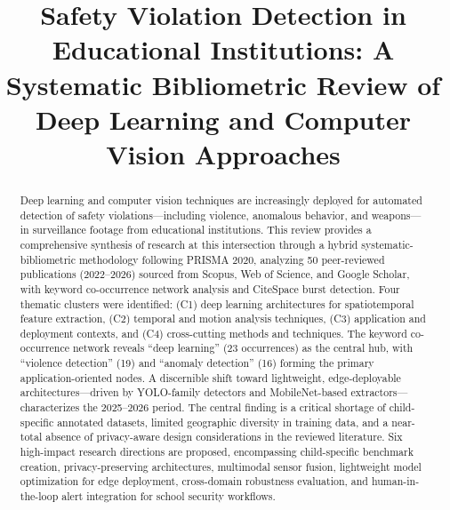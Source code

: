 \documentclass[conference]{IEEEtran}
\begin{document}
\title{Safety Violation Detection in Educational Institutions: A Systematic Bibliometric Review of Deep Learning and Computer Vision Approaches}

\author{
\and
{}
}

\maketitle

\begin{abstract}
Deep learning and computer vision techniques are increasingly deployed for automated detection of safety violations---including violence, anomalous behavior, and weapons---in surveillance footage from educational institutions. This review provides a comprehensive synthesis of research at this intersection through a hybrid systematic-bibliometric methodology following PRISMA 2020, analyzing 50 peer-reviewed publications (2022--2026) sourced from Scopus, Web of Science, and Google Scholar, with keyword co-occurrence network analysis and CiteSpace burst detection. Four thematic clusters were identified: (C1) deep learning architectures for spatiotemporal feature extraction, (C2) temporal and motion analysis techniques, (C3) application and deployment contexts, and (C4) cross-cutting methods and techniques. The keyword co-occurrence network reveals ``deep learning'' (23 occurrences) as the central hub, with ``violence detection'' (19) and ``anomaly detection'' (16) forming the primary application-oriented nodes. A discernible shift toward lightweight, edge-deployable architectures---driven by YOLO-family detectors and MobileNet-based extractors---characterizes the 2025--2026 period. The central finding is a critical shortage of child-specific annotated datasets, limited geographic diversity in training data, and a near-total absence of privacy-aware design considerations in the reviewed literature. Six high-impact research directions are proposed, encompassing child-specific benchmark creation, privacy-preserving architectures, multimodal sensor fusion, lightweight model optimization for edge deployment, cross-domain robustness evaluation, and human-in-the-loop alert integration for school security workflows.
\end{abstract}
\end{document}
